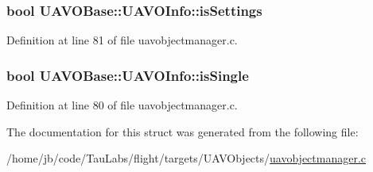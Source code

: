 \hypertarget{struct_u_a_v_o_base_1_1_u_a_v_o_info_a24c38e3db94c7b88d4dd0cfdd2736b4d}{
\subsubsection[{is\-Settings}]{\setlength{\rightskip}{0pt plus 5cm}bool {\bf \-U\-A\-V\-O\-Base\-::\-U\-A\-V\-O\-Info\-::is\-Settings}}}\label{struct_u_a_v_o_base_1_1_u_a_v_o_info_a24c38e3db94c7b88d4dd0cfdd2736b4d}


\-Definition at line 81 of file uavobjectmanager.\-c.

\hypertarget{struct_u_a_v_o_base_1_1_u_a_v_o_info_a2ac5c0e20d294c304f14e18fd2fdc61a}{
\subsubsection[{is\-Single}]{\setlength{\rightskip}{0pt plus 5cm}bool {\bf \-U\-A\-V\-O\-Base\-::\-U\-A\-V\-O\-Info\-::is\-Single}}}\label{struct_u_a_v_o_base_1_1_u_a_v_o_info_a2ac5c0e20d294c304f14e18fd2fdc61a}


\-Definition at line 80 of file uavobjectmanager.\-c.



\-The documentation for this struct was generated from the following file\-:\begin{DoxyCompactItemize}
\item 
/home/jb/code/\-Tau\-Labs/flight/targets/\-U\-A\-V\-Objects/\hyperlink{uavobjectmanager_8c}{uavobjectmanager.\-c}\end{DoxyCompactItemize}
